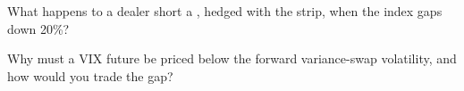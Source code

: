 \begin{interviewq}\label{iq:dv:variance-swaps-and-volatility-derivatives:5}
What happens to a dealer short a , hedged with the strip, when the index gaps down 20\%?
\end{interviewq}

\begin{interviewq}\label{iq:dv:variance-swaps-and-volatility-derivatives:6}
Why must a VIX future be priced below the forward variance-swap volatility, and how would you trade the gap?
\end{interviewq}
